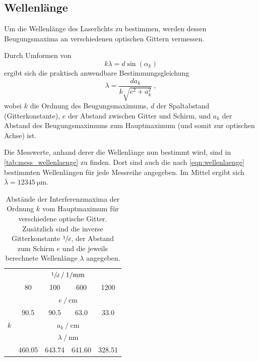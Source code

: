 \subsection{Wellenlänge}
\label{sec:auswertung:wellenlaenge}
Um die Wellenlänge des Laserlichts zu bestimmen,
werden dessen Beugungsmaxima an verschiedenen optischen Gittern vermessen.

Durch Umformen von
\begin{equation*}
  k \lambda = d \sin(\alpha_k)
\end{equation*}
ergibt sich die praktisch anwendbare Bestimmungsgleichung
\begin{equation}
  \lambda = \frac{d a_k}{k \sqrt{e^2 + a_k^2}} \ ,
  \label{eqn:wellenlaenge}
\end{equation}
wobei $k$ die Ordnung des Beugungsmaximums,
$d$ der Spaltabstand (Gitterkonstante),
$e$ der Abstand zwischen Gitter und Schirm, %
und $a_k$ der Abstand des Beugungsmaximums zum Hauptmaximum (und somit zur optischen Achse)
ist.

Die Messwerte, anhand derer die Wellenlänge nun bestimmt wird, sind in \autoref{tab:mess_wellenlaenge} zu finden.
Dort sind auch die nach \autoref{eqn:wellenlaenge} bestimmten Wellenlängen für jede Messreihe angegeben.
Im Mittel ergibt sich $\bar\lambda = \SI{12345}{\micro\meter}$.


\begin{table}
  \centering
  \caption{
    Abstände der Interferenzmaxima der Ordnung $k$ vom Hauptmaximum für verschiedene optische Gitter.
    Zusätzlich sind die inverse Gitterkonstante $\sfrac{1}{d}$, der Abstand zum Schirm $e$ und die jeweils berechnete Wellenlänge $\lambda$ angegeben.
  }
  \label{tab:mess_wellenlaenge}
  \begin{tabular}{S S S S S}
  \toprule
  &  \\
  \cmidrule(lr){2-5}
  & 80 & 100 & 600 & 1200 \\
  \midrule

  &  \\
  \cmidrule(lr){2-5}
  & 90.5 & 90.5 & 63.0 & 33.0 \\
  \midrule

  {$k$} &
   \\
  \midrule

  \midrule

  &  \\
  \cmidrule(lr){2-5}
  & 460.05  & 643.74  & 641.60  & 328.51  \\
  \bottomrule
  \end{tabular}
\end{table}
